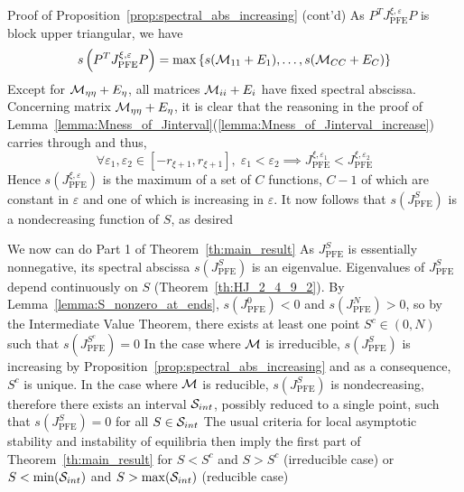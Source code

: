 \documentclass[aspectratio=169]{beamer}
\begin{document}
\begin{frame}{Proof of Proposition~\ref{prop:spectral_abs_increasing} (cont'd)}
	As $P^TJ_{\textrm{PFE}}^{\xi,\varepsilon}P$ is block upper triangular, we have
	\[
	s\left(P^TJ_{\textrm{PFE}}^{\xi,\varepsilon}P\right)
	=
	\max\left\{s(\M_{11}+E_1),\ldots,s(\M_{CC}+E_C)\right\}
	\]
	\vfill
	Except for $\M_{\eta\eta}+E_\eta$, all matrices $\M_{ii}+E_i$ have fixed spectral abscissa.
	Concerning matrix $\M_{\eta\eta}+E_\eta$, it is clear that the reasoning in the proof of Lemma~\ref{lemma:Mness_of_Jinterval}(\ref{lemma:Mness_of_Jinterval_increase}) carries through and thus,
	\[
	\forall \varepsilon_1,\varepsilon_2\in[-r_{\xi+1},r_{\xi+1}],
	\;
	\varepsilon_1<\varepsilon_2
	\implies
	J_{\textrm{PFE}}^{\xi,\varepsilon_1}
	< J_{\textrm{PFE}}^{\xi,\varepsilon_2}
	\]
	\vfill
	Hence $s(J_{\textrm{PFE}}^{\xi,\varepsilon})$ is the maximum of a set of $C$ functions, $C-1$ of which are constant in $\varepsilon$ and one of which is increasing in $\varepsilon$. 
	It now follows that $s(J_{\textrm{PFE}}^S)$ is a nondecreasing function of $S$, as desired
\end{frame}

\begin{frame}{We now can do Part 1 of Theorem~\ref{th:main_result}}
	As $J_{\textrm{PFE}}^S$ is essentially nonnegative, its spectral abscissa $s(J_{\textrm{PFE}}^S)$ is an eigenvalue.
	Eigenvalues of $J_{\textrm{PFE}}^S$ depend continuously on $S$ (Theorem~\ref{th:HJ_2_4_9_2}). By Lemma~\ref{lemma:S_nonzero_at_ends}, $s(J_{\textrm{PFE}}^0)<0$ and $s(J_{\textrm{PFE}}^N)>0$, so by the Intermediate Value Theorem, there exists at least one point $S^c\in(0,N)$ such that $s(J_{\textrm{PFE}}^{S^c})=0$
	\vfill
	In the case where $\M$ is irreducible, $s(J_{\textrm{PFE}}^S)$ is increasing by Proposition~\ref{prop:spectral_abs_increasing} and as a consequence, $S^c$ is unique. In the case where $\M$ is reducible, $s(J_{\textrm{PFE}}^S)$ is nondecreasing, therefore there exists an interval $\S_{int}$, possibly reduced to a single point, such that $s(J_{\textrm{PFE}}^S)=0$ for all $S\in\S_{int}$
	\vfill
	The usual criteria for local asymptotic stability and instability of equilibria then imply the first part of Theorem~\ref{th:main_result} for $S<S^c$ and $S>S^c$ (irreducible case) or $S<\min(\S_{int})$ and $S>\max(\S_{int})$ (reducible case)
\end{frame}
\end{document}
